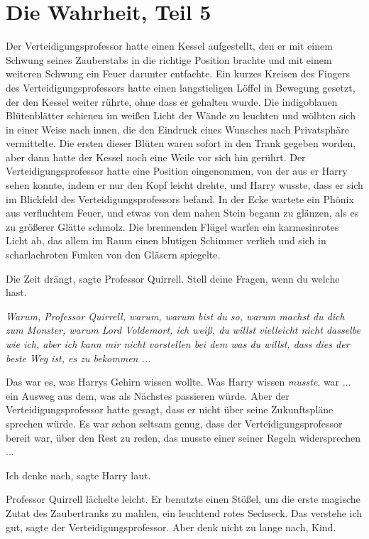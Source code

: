 \chapter{Die Wahrheit, Teil 5}

Der Verteidigungsprofessor hatte einen Kessel aufgestellt, den er mit einem
Schwung seines Zauberstabs in die richtige Position brachte und mit einem
weiteren Schwung ein Feuer darunter entfachte. Ein kurzes Kreisen des Fingers
des Verteidigungsprofessors hatte einen langstieligen Löffel in Bewegung
gesetzt, der den Kessel weiter rührte, ohne dass er gehalten wurde. Die
indigoblauen Blütenblätter schienen im weißen Licht der Wände zu leuchten und
wölbten sich in einer Weise nach innen, die den Eindruck eines Wunsches nach
Privatsphäre vermittelte. Die ersten dieser Blüten waren sofort in den Trank
gegeben worden, aber dann hatte der Kessel noch eine Weile vor sich hin gerührt.
Der Verteidigungsprofessor hatte eine Position eingenommen, von der aus er Harry
sehen konnte, indem er nur den Kopf leicht drehte, und Harry wusste, dass er
sich im Blickfeld des Verteidigungsprofessors befand. In der Ecke wartete ein
Phönix aus verfluchtem Feuer, und etwas von dem nahen Stein begann zu glänzen,
als es zu größerer Glätte schmolz. Die brennenden Flügel warfen ein
karmesinrotes Licht ab, das allem im Raum einen blutigen Schimmer verlieh und
sich in scharlachroten Funken von den Gläsern spiegelte.

\glqq{}Die Zeit drängt\grqq{}, sagte Professor Quirrell. \glqq{}Stell deine
Fragen, wenn du welche hast.\grqq{}

\emph{Warum, Professor Quirrell, warum, warum bist du so, warum machst du dich
zum Monster, warum Lord Voldemort, ich weiß, du willst vielleicht nicht dasselbe
wie ich, aber ich kann mir nicht vorstellen bei dem was du willst, dass dies der
beste Weg ist, es zu bekommen ...}

Das war es, was Harrys Gehirn wissen wollte. Was Harry wissen \emph{musste},
war ... ein Ausweg aus dem, was als Nächstes passieren würde. Aber der
Verteidigungsprofessor hatte gesagt, dass er nicht über seine Zukunftspläne
sprechen würde. Es war schon seltsam genug, dass der Verteidigungsprofessor
bereit war, über den Rest zu reden, das musste einer seiner Regeln
widersprechen ...

\glqq{}Ich denke nach\grqq{}, sagte Harry laut.

Professor Quirrell lächelte leicht. Er benutzte einen Stößel, um die erste
magische Zutat des Zaubertranks zu mahlen, ein leuchtend rotes Sechseck. \glqq{}
Das verstehe ich gut\grqq{}, sagte der Verteidigungsprofessor. \glqq{}Aber denk
nicht zu lange nach, Kind.\grqq{}

